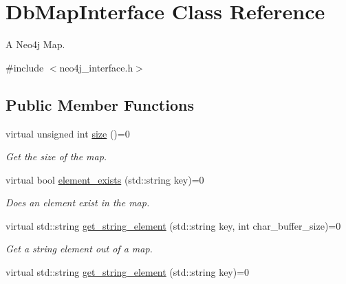\hypertarget{classDbMapInterface}{\section{Db\-Map\-Interface Class Reference}
\label{classDbMapInterface}
}


A Neo4j Map.  




{\ttfamily \#include $<$neo4j\-\_\-interface.\-h$>$}

\subsection*{Public Member Functions}
\begin{DoxyCompactItemize}
\item 
\hypertarget{classDbMapInterface_a56d046e72d1856177adc71a0aaa09952}{virtual unsigned int \hyperlink{classDbMapInterface_a56d046e72d1856177adc71a0aaa09952}{size} ()=0}\label{classDbMapInterface_a56d046e72d1856177adc71a0aaa09952}

\begin{DoxyCompactList}\small\item\em Get the size of the map. \end{DoxyCompactList}\item 
\hypertarget{classDbMapInterface_a52b0123024a6064da02e68d6c0204fdc}{virtual bool \hyperlink{classDbMapInterface_a52b0123024a6064da02e68d6c0204fdc}{element\-\_\-exists} (std\-::string key)=0}\label{classDbMapInterface_a52b0123024a6064da02e68d6c0204fdc}

\begin{DoxyCompactList}\small\item\em Does an element exist in the map. \end{DoxyCompactList}\item 
\hypertarget{classDbMapInterface_ae65d2f6aaad50dc9728ba8aeb6cc557f}{virtual std\-::string \hyperlink{classDbMapInterface_ae65d2f6aaad50dc9728ba8aeb6cc557f}{get\-\_\-string\-\_\-element} (std\-::string key, int char\-\_\-buffer\-\_\-size)=0}\label{classDbMapInterface_ae65d2f6aaad50dc9728ba8aeb6cc557f}

\begin{DoxyCompactList}\small\item\em Get a string element out of a map. \end{DoxyCompactList}\item 
\hypertarget{classDbMapInterface_a26cfc56d753345b64fa9ab08b10dac34}{virtual std\-::string \hyperlink{classDbMapInterface_a26cfc56d753345b64fa9ab08b10dac34}{get\-\_\-string\-\_\-element} (std\-::string key)=0}\label{classDbMapInterface_a26cfc56d753345b64fa9ab08b10dac34}


\end{DoxyCompactItemize}
